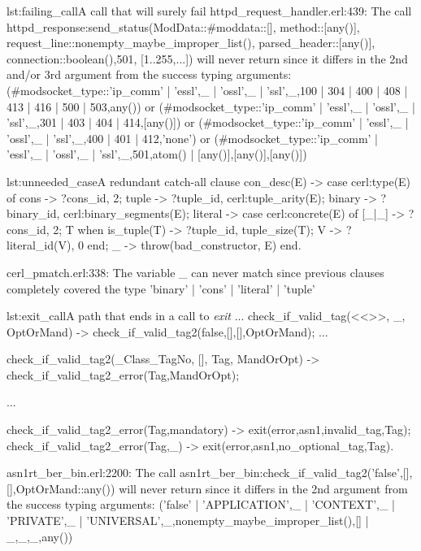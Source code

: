 \begin{console}{lst:failing_call}{A call that will surely fail}
httpd_request_handler.erl:439: The call
httpd_response:send_status(ModData::#mod{data::[], method::[any()],
  request_line::nonempty_maybe_improper_list(),
  parsed_header::[any()], connection::boolean()},501, [1..255,...])
will never return since it differs in the 2nd and/or 3rd argument from
the success typing arguments: (#mod{socket_type::'ip_comm' |
  {'essl',_} | {'ossl',_} | {'ssl',_}},100 | 304 | 400 | 408 | 413 |
416 | 500 | 503,any()) or (#mod{socket_type::'ip_comm' | {'essl',_} |
  {'ossl',_} | {'ssl',_}},301 | 403 | 404 | 414,[any()]) or
(#mod{socket_type::'ip_comm' | {'essl',_} | {'ossl',_} |
  {'ssl',_}},400 | 401 | 412,'none') or (#mod{socket_type::'ip_comm' |
  {'essl',_} | {'ossl',_} | {'ssl',_}},501,{atom() |
  [any()],[any()],[any()]})

\end{console}

\begin{console}{lst:unneeded_case}{A redundant catch-all clause}
con_desc(E) ->
    case cerl:type(E) of
	cons -> {?cons_id, 2};
	tuple -> {?tuple_id, cerl:tuple_arity(E)};
	binary -> {?binary_id, cerl:binary_segments(E)};
	literal ->
	    case cerl:concrete(E) of
		[_|_] -> {?cons_id, 2};
		T when is_tuple(T) -> {?tuple_id, tuple_size(T)};
		V -> {?literal_id(V), 0}
	    end;
	_ ->
	    throw({bad_constructor, E})
    end.


cerl_pmatch.erl:338: The variable _ can never match since previous clauses
completely covered the type 'binary' | 'cons' | 'literal' | 'tuple'
\end{console}

\begin{console}{lst:exit_call}{A path that ends in a call to \emph{exit}}
...
check_if_valid_tag(<<>>, _, OptOrMand) ->
    check_if_valid_tag2(false,[],[],OptOrMand);
...

check_if_valid_tag2(_Class_TagNo, [], Tag, MandOrOpt) ->
    check_if_valid_tag2_error(Tag,MandOrOpt);

...

check_if_valid_tag2_error(Tag,mandatory) ->
    exit({error,{asn1,{invalid_tag,Tag}}});
check_if_valid_tag2_error(Tag,_) ->
    exit({error,{asn1,{no_optional_tag,Tag}}}).


asn1rt_ber_bin.erl:2200: The call
asn1rt_ber_bin:check_if_valid_tag2('false',[],[],OptOrMand::any()) will never
return since it differs in the 2nd argument from the success typing arguments:
('false' | {'APPLICATION',_} | {'CONTEXT',_} | {'PRIVATE',_} |
{'UNIVERSAL',_},nonempty_maybe_improper_list(),[] | {_,_,_},any())
\end{console}

